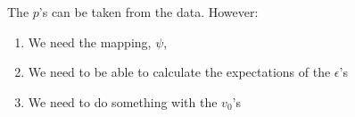 \documentclass[11pt]{article}
\begin{document}
The \(p\)'s can be taken from the data.  However:

\begin{enumerate}
\item We need the mapping, \(\psi\),
\item We need to be able to calculate the expectations of the \(\epsilon\)'s
\item We need to do something with the \(v_0\)'s
\end{enumerate}
\end{document}
